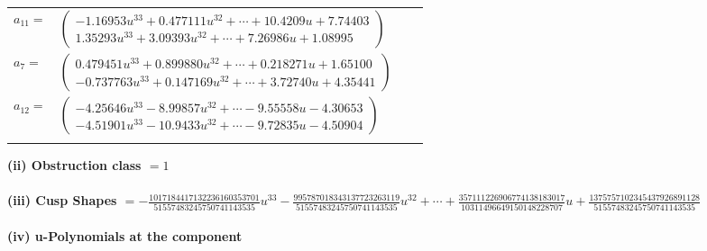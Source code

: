 \documentclass[1p]{elsarticle_modified}
\theoremstyle{definition}
\begin{document}
\begin{tabular}{m{7pt} m{180pt} m{7pt} m{180pt} }
\flushright $a_{11}=$&$\begin{pmatrix}-1.16953 u^{33}+0.477111 u^{32}+\cdots+10.4209 u+7.74403\\1.35293 u^{33}+3.09393 u^{32}+\cdots+7.26986 u+1.08995\end{pmatrix}$ \\
\flushright $a_{7}=$&$\begin{pmatrix}0.479451 u^{33}+0.899880 u^{32}+\cdots+0.218271 u+1.65100\\-0.737763 u^{33}+0.147169 u^{32}+\cdots+3.72740 u+4.35441\end{pmatrix}$ \\
\flushright $a_{12}=$&$\begin{pmatrix}-4.25646 u^{33}-8.99857 u^{32}+\cdots-9.55558 u-4.30653\\-4.51901 u^{33}-10.9433 u^{32}+\cdots-9.72835 u-4.50904\end{pmatrix}$\\&\end{tabular}
\flushleft \textbf{(ii) Obstruction class $= 1$}\\~\\
\flushleft \textbf{(iii) Cusp Shapes $= -\frac{1017184417132236160353701}{51557483245750741143535} u^{33}-\frac{995787018343137723263119}{51557483245750741143535} u^{32}+\cdots+\frac{357111226906774138183017}{10311496649150148228707} u+\frac{1375757102345437926891128}{51557483245750741143535}$}\\~\\
\newpage\renewcommand{\arraystretch}{1}
\flushleft \textbf{(iv) u-Polynomials at the component}\newline \\
\end{document}
